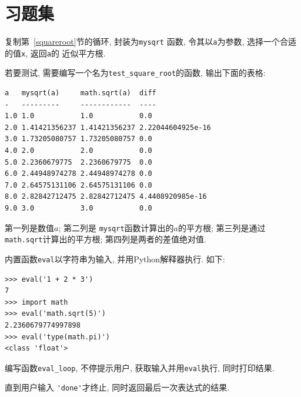 \documentclass[10pt]{book}
\begin{document}
\section{习题集}

\begin{exercise}

复制第~\ref{squareroot}节的循环, 封装为\verb"mysqrt" 函数, 
令其以{\tt a}为参数, 选择一个合适的值{\tt x}, 返回{\tt a}的
近似平方根.  

若要测试, 需要编写一个名为\verb"test_square_root"的函数, 
输出下面的表格:

\begin{verbatim}
a   mysqrt(a)     math.sqrt(a)  diff
-   ---------     ------------  ----
1.0 1.0           1.0           0.0
2.0 1.41421356237 1.41421356237 2.22044604925e-16
3.0 1.73205080757 1.73205080757 0.0
4.0 2.0           2.0           0.0
5.0 2.2360679775  2.2360679775  0.0
6.0 2.44948974278 2.44948974278 0.0
7.0 2.64575131106 2.64575131106 0.0
8.0 2.82842712475 2.82842712475 4.4408920985e-16
9.0 3.0           3.0           0.0
\end{verbatim}
%
第一列是数值$a$; 第二列是 \verb"mysqrt"函数计算出的$a$的平方根;
第三列是通过{\tt math.sqrt}计算出的平方根;
第四列是两者的差值绝对值. 
\end{exercise}


\begin{exercise}
内置函数{\tt eval}以字符串为输入, 并用Python解释器执行. 
如下:

\begin{verbatim}
>>> eval('1 + 2 * 3')
7
>>> import math
>>> eval('math.sqrt(5)')
2.2360679774997898
>>> eval('type(math.pi)')
<class 'float'>
\end{verbatim}
%
编写函数\verb"eval_loop", 不停提示用户, 获取输入并用{\tt eval}执行, 
同时打印结果. 

直到用户输入 \verb"'done'"才终止, 
同时返回最后一次表达式的结果. 

\end{exercise}
\end{document}
